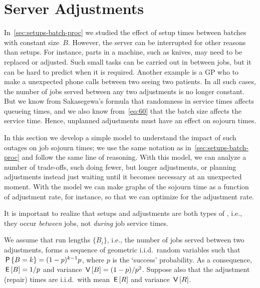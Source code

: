 


\section{Server Adjustments}
\label{sec:non-preempt-interr}


In~\cref{sec:setups-batch-proc} we studied the effect of setup times between batches with constant size~$B$.
However, the server can be interrupted for other reasons than setups.
For instance, parts in a machine, such as knives, may need to be replaced or adjusted.
Such small tasks can be carried out in between jobs, but it can be hard to predict when it is required.
Another example is a GP who  to make a unexpected phone calls between two seeing two patients.
In all such cases, the number of jobs
served between any two adjustments
is no longer constant.
But we know from Sakasegewa's formula that randomness in service times affects queueing times, and we also know from~\cref{eq:60} that the batch size affects the service time.
Hence, unplanned adjustments must have an effect on sojourn times.


In this section we develop a simple model to understand the impact of such outages on job sojourn times; we use the same notation as in~\cref{sec:setups-batch-proc} and follow the same line of reasoning.
With this model, we can analyze a number of trade-offs, such doing fewer, but longer adjustments, or planning adjustments instead just waiting until it becomes necessary at an unexpected moment. With the model we can make graphs of the sojourn time as a function of adjustment rate, for instance, so that we can optimize for the adjustment rate.

It is important to realize that setups and adjustments are both types of , i.e., they occur \emph{between} jobs, not \emph{during}  job service times. 




We assume that run lengths $\{B_i\}$, i.e., the number of jobs served between two adjustments, forms a sequence of geometric i.i.d.\ random variables such that $\P{B=k} = (1-p)^{k-1}p$, where $p$ is the `success' probability.
As a consequence, $\E B=1/p$ and variance $\V B = (1-p)/p^2$. Suppose also that the adjustment (repair) times are i.i.d.\ with mean $\E R$ and variance $\V R$.

